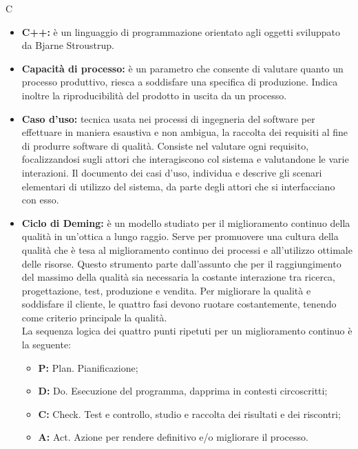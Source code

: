 \Huge C
\normalsize
\begin{itemize}
\item \textbf{C++:} è un linguaggio di programmazione orientato agli oggetti sviluppato da Bjarne Stroustrup.

\item \textbf{Capacità di processo:} è un parametro che consente di valutare quanto un processo produttivo, riesca a soddisfare una specifica di produzione. Indica inoltre la riproducibilità del prodotto in uscita da un processo.

\item \textbf{Caso d'uso:} tecnica usata nei processi di ingegneria del software per effettuare in maniera esaustiva e non ambigua, la raccolta dei requisiti al fine di produrre software di qualità.
Consiste nel valutare ogni requisito, focalizzandosi sugli attori che interagiscono col sistema e valutandone le varie interazioni. Il documento dei casi d'uso, individua e descrive gli scenari elementari di utilizzo del sistema, da parte degli attori che si interfacciano con esso.

\item \textbf{Ciclo di Deming:} è un modello studiato per il miglioramento continuo della qualità in un'ottica a lungo raggio. Serve per promuovere una cultura della qualità che è tesa al miglioramento continuo dei processi e all'utilizzo ottimale delle risorse. Questo strumento parte dall'assunto che per il raggiungimento del massimo della qualità sia necessaria la costante interazione tra ricerca, progettazione, test, produzione e vendita. Per migliorare la qualità e soddisfare il cliente, le quattro fasi devono ruotare costantemente, tenendo come criterio principale la qualità.
\\La sequenza logica dei quattro punti ripetuti per un miglioramento continuo è la seguente:
\begin{itemize}
	\item \textbf{P:} Plan. Pianificazione;
	\item \textbf{D:} Do. Esecuzione del programma, dapprima in contesti circoscritti;
	\item \textbf{C:} Check. Test e controllo, studio e raccolta dei risultati e dei riscontri;
	\item \textbf{A:} Act. Azione per rendere definitivo e/o migliorare il processo.
\end{itemize}


\end{itemize}
